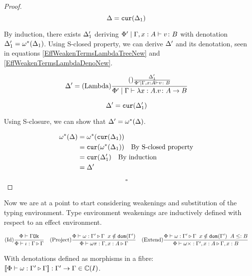 \documentclass{Report}
\begin{document}
\begin{proof}
    \begin{equation}\label{EffWeakenTermsLambdaDeno}
        \Delta = \texttt{cur}(\Delta_1)\\
    \end{equation}

    By induction, there exists $\Delta_1'$ deriving $\Phi'\mid\Gamma, x: A \vdash v \colon B$ with denotation $\Delta_1' = \omega^*(\Delta_1)$. Using S-closed property, we can derive $\Delta'$ and its denotation, seen in equations \ref{EffWeakenTermsLambdaTreeNew} and \ref{EffWeakenTermsLambdaDenoNew}.

    \begin{equation}
        \label{EffWeakenTermsLambdaTreeNew}
        \Delta' = (\text{Lambda}) \frac{
            (\text{}) \frac{\Delta_1'}{\Phi'\mid\Gamma, x: A \vdash v \colon B}
        }{\Phi'\mid\Gamma \vdash \lambda x : A. v \colon A\rightarrow B}
    \end{equation}


    \begin{equation}\label{EffWeakenTermsLambdaDenoNew}
        \Delta' = \texttt{cur}(\Delta_1')\\
    \end{equation}

    Using S-closure, we can show that $\Delta' = \omega^*(\Delta)$.

    \begin{align}
        \omega^*(\Delta) & = \omega^*(\texttt{cur}(\Delta_1))\\
        & = \texttt{cur}(\omega^*(\Delta_1))\quad\text{By S-closed property}\\
        & = \texttt{cur}(\Delta_1')\quad\text{By induction}\\
        & = \Delta'
    \end{align}

    $$\square$$

\end{proof}




Now we are at a point to start considering weakenings and substitution of the typing environment. Type environment weakenings are inductively defined with respect to an effect environment.


\[
    (\text{Id}) \frac{\Phi\vdash \Gamma \texttt{Ok}}{\Phi\vdash \iota : \Gamma \triangleright \Gamma}
    \quad  
    (\text{Project}) \frac{\Phi\vdash \omega : \Gamma' \triangleright \Gamma\;\; x \notin \texttt{dom}(\Gamma')}{\Phi\vdash \omega \pi : \Gamma, x: A \triangleright \Gamma}
    \quad
    (\text{Extend}) \frac{\Phi\vdash \omega : \Gamma' \triangleright \Gamma\;\; x \notin \texttt{dom}(\Gamma')\;\; A \leq: B}{\Phi\vdash \omega \times : \Gamma', x: A \triangleright \Gamma, x: B}
\]

With denotations defined as morphisms in a fibre: ${\bf [\![}\Phi\vdash \omega : \Gamma' \triangleright \Gamma{\bf ]\!]}: \Gamma' \rightarrow \Gamma \in \mathbb{C}(I)$.
\end{document}
